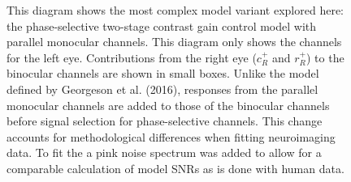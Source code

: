 \documentclass[
  12pt,
]{article}
\begin{document}
\begin{figure}


\caption{\label{fig-modelDiagram}This diagram shows the most complex
model variant explored here: the phase-selective two-stage contrast gain
control model with parallel monocular channels. This diagram only shows
the channels for the left eye. Contributions from the right eye
(\(c^+_R\) and \(r^+_R\)) to the binocular channels are shown in small
boxes. Unlike the model defined by Georgeson et al. (2016), responses
from the parallel monocular channels are added to those of the binocular
channels before signal selection for phase-selective channels. This
change accounts for methodological differences when fitting neuroimaging
data. To fit the a pink noise spectrum was added to allow for a
comparable calculation of model SNRs as is done with human data.}

\end{figure}%
\end{document}
